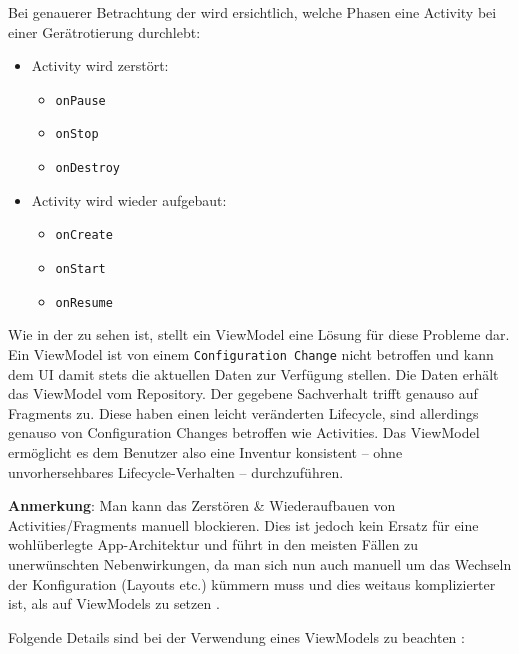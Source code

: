 Bei genauerer Betrachtung der  wird ersichtlich, welche
Phasen eine Activity bei einer Gerätrotierung durchlebt:

\begin{itemize}
\tightlist
\item
  Activity wird zerstört:

  \begin{itemize}
  \tightlist
  \item
    \texttt{onPause}
  \item
    \texttt{onStop}
  \item
    \texttt{onDestroy}
  \end{itemize}
\item
  Activity wird wieder aufgebaut:

  \begin{itemize}
  \tightlist
  \item
    \texttt{onCreate}
  \item
    \texttt{onStart}
  \item
    \texttt{onResume}
  \end{itemize}
\end{itemize}

Wie in der  zu sehen ist, stellt ein ViewModel eine
Lösung für diese Probleme dar. Ein ViewModel ist von einem
\texttt{Configuration\ Change} nicht betroffen und kann dem UI damit
stets die aktuellen Daten zur Verfügung stellen. Die Daten erhält das
ViewModel vom Repository. Der gegebene Sachverhalt trifft genauso auf
Fragments zu. Diese haben einen leicht veränderten Lifecycle, sind
allerdings genauso von Configuration Changes betroffen wie Activities.
Das ViewModel ermöglicht es dem Benutzer also eine Inventur konsistent
-- ohne unvorhersehbares Lifecycle-Verhalten -- durchzuführen.

\textbf{Anmerkung}: Man kann das Zerstören \& Wiederaufbauen von
Activities/Fragments manuell blockieren. Dies ist jedoch kein Ersatz für
eine wohlüberlegte App-Architektur und führt in den meisten Fällen zu
unerwünschten Nebenwirkungen, da man sich nun auch manuell um das
Wechseln der Konfiguration (Layouts etc.) kümmern muss und dies weitaus
komplizierter ist, als auf ViewModels zu setzen
\cite{lifecycle-blocking}.

Folgende Details sind bei der Verwendung eines ViewModels zu beachten
\cite{viewmodel-antipatterns}:

